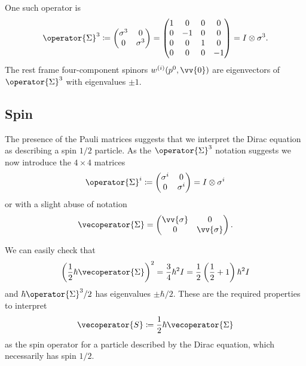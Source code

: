 \documentclass[fleqn]{NotesClass}
\newcommand{\ident}{I}
\begin{document}
    One such operator is
    \begin{equation}
        \operator{\Sigma}^3 \coloneqq
        \begin{pmatrix}
            \sigma^3 & 0\\
            0 & \sigma^3
        \end{pmatrix}
        =
        \begin{pmatrix}
            1 & 0 & 0 & 0\\
            0 & -1 & 0 & 0\\
            0 & 0 & 1 & 0\\
            0 & 0 & 0 & -1
        \end{pmatrix}
        = \ident \otimes \sigma^3.
    \end{equation}
    The rest frame four-component spinors \(w^{(i)}(p^0, \vv{0})\) are eigenvectors of \(\operator{\Sigma}^3\) with eigenvalues \(\pm 1\).
    
    \subsection{Spin}
    The presence of the Pauli matrices suggests that we interpret the Dirac equation as describing a spin \(1/2\) particle.
    As the \(\operator{\Sigma}^3\) notation suggests we now introduce the \(4\times 4\) matrices
    \begin{equation}
        \operator{\Sigma}^i \coloneqq 
        \begin{pmatrix}
            \sigma^i & 0\\
            0 & \sigma^i
        \end{pmatrix}
        = \ident \otimes \sigma^i
    \end{equation}
    or with a slight abuse of notation
    \begin{equation}
        \vecoperator{\Sigma} = 
        \begin{pmatrix}
            \vv{\sigma} & 0\\
            0 & \vv{\sigma}
        \end{pmatrix}
        .
    \end{equation}
    
    We can easily check that
    \begin{equation}
        \left( \frac{1}{2}\hbar\vecoperator{\Sigma} \right)^2 = \frac{3}{4}\hbar^2\ident = \frac{1}{2}\left( \frac{1}{2} + 1 \right)\hbar^2I
    \end{equation}
    and \(\hbar\operator{\Sigma}^3/2\) has eigenvalues \(\pm \hbar/2\).
    These are the required properties to interpret
    \begin{equation}
        \vecoperator{S} \coloneqq \frac{1}{2}\hbar\vecoperator{\Sigma}
    \end{equation}
    as the spin operator for a particle described by the Dirac equation, which necessarily has spin \(1/2\).
    
\end{document}
